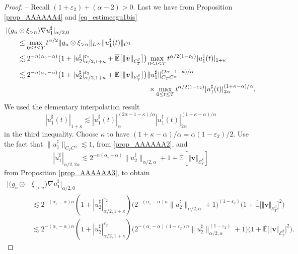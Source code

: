 \documentclass[JEP,XML,SOM,Unicode,published]{cedram}
\theoremstyle{definition}
\let\epsilon\varepsilon
\newcommand\bbE{\mathbb{E}}
\newcommand{\mcE}{\mathcal{E}}
\newcommand{\bsv}{\boldsymbol{v}}
\newcommand{\norme}[1]{\Vert #1 \Vert}
\begin{document}
\begin{proof}
-- Recall $(1 + \epsilon_2) + (\alpha - 2) > 0$. Last we have from Proposition \ref{prop_AAAAAA4} and \eqref{eq_estimeegu1bis}
\begin{align*}
| (g_u &\odot \xi_{> n}) \nabla u_1^{\sharp} |_{\alpha / 2, 0} \\
&\leq
\max_{0 \leq t \leq T} t^{\alpha / 2} \| g_u \odot \xi_{> n}
\|_{L^{\infty}} \| {u_1^{\sharp}} (t) \|_{C^1}
\\
& \lesssim 2^{- n (\alpha_{\circ} - \alpha)} \bigl(1 + | u_2^{\sharp}
|^{\epsilon_2}_{\alpha / 2, 1 + \kappa} + \overline{\bbE}\bigl[\norme{\bsv}_{\mcE^\beta_T}\bigr] \bigr) \max_{0 \leq t \leq T} t^{\alpha
/ 2 (1 - \epsilon_2)} | {u_1^{\sharp}} (t) |_{1 + \kappa}
\\
& \lesssim 2^{- n (\alpha_{\circ} - \alpha)} \bigl( 1 + | u_2^{\sharp}
|^{\epsilon_2}_{\alpha / 2, 1 + \kappa} + \overline{\bbE}\bigl[\norme{\bsv}_{\mcE^\beta_T}\bigr] \bigr) \| {u_1^{\sharp}}
\|_{C_T C^{\alpha}}^{(2 \alpha - 1 - \kappa) / \alpha}
\\
&\hspace{6.5cm} \times \max_{0 \leq
t \leq T} t^{{\alpha / 2 (1 - \epsilon_2)}} |
{u_1^{\sharp}} (t) |^{(1 + \kappa - \alpha) / \alpha}_{2 \alpha}.
\end{align*}
We used the elementary interpolation result
\[
| {u_1^{\sharp}} (t) |_{1 + \kappa} \lesssim |
{u_1^{\sharp}} (t) |^{(2 \alpha - 1 - \kappa) / \alpha}_{\alpha}
| {u_1^{\sharp}} (t) |^{(1 + \kappa - \alpha) / \alpha}_{ 2
\alpha}
\]
in the third inequality. Choose $\kappa$ to have $(1 + \kappa
- \alpha) / \alpha = \alpha (1 - \epsilon_2) / 2$. Use the fact that $\|
u_1^{\sharp} \|_{C_T C^{\alpha}} \lesssim 1$, from \ref{prop_AAAAAA2}, and
\[
| u_1^{\sharp}|_{\alpha / 2, 2 \alpha} \lesssim 2^{- n (\alpha_{\circ} - \alpha)} \| u_2^{\sharp} \|_{\alpha / 2, \alpha} + 1 + \overline{\bbE}[\norme{\bsv}_{\mcE^\beta_T}]
\]
from Proposition \ref{prop_AAAAAA3}, to obtain
\begin{align*}
| (g_u \odot &\xi_{> n}) \nabla u_1^{\sharp} |_{\alpha / 2, 0}
\\
& \lesssim
2^{- (\alpha_{\circ} - \alpha) n} (1 + | u_2^{\sharp}
|^{\epsilon_2}_{\alpha / 2, 1 + \kappa}) \bigl(2^{- (\alpha_{\circ} - \alpha) n} \| u_2^{\sharp} \|_{\alpha / 2, \alpha} + 1\bigr)^{(1 - \epsilon_2)}\bigl(1+\overline{\bbE}\bigl[\norme{\bsv}_{\mcE^\beta_T}\bigr]^2\bigr)
\\
&\lesssim 2^{- (\alpha_{\circ} - \alpha) n} (1 + | u_2^{\sharp}
|^{\epsilon_2}_{\alpha / 2, 1 + \kappa}) \bigl(2^{- (\alpha_{\circ} - \alpha)
(1 - \epsilon_2) n} \| u_2^{\sharp} \|^{{(1 - \epsilon_2)}}_{\alpha / 2, \alpha} + 1\bigr)\bigl(1+\overline{\bbE}\bigl[\norme{\bsv}_{\mcE^\beta_T}\bigr]^2\bigr).
\end{align*}


\end{proof}
\end{document}
